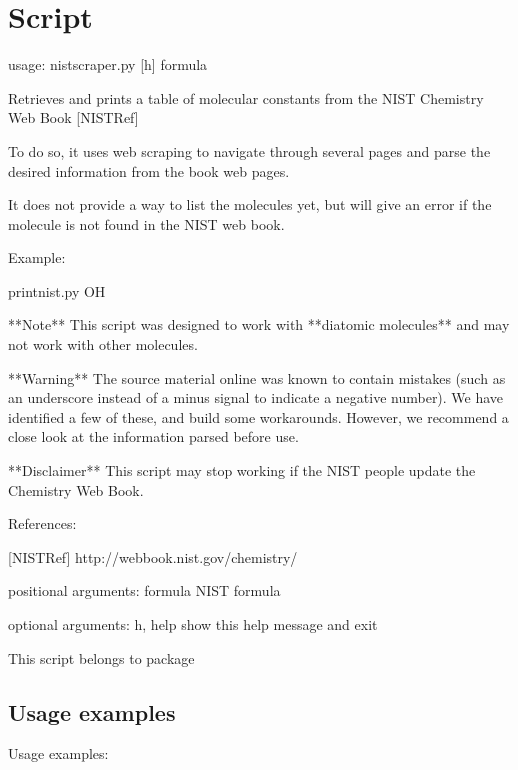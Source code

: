 \documentclass[letterpaper,10pt,english]{sphinxmanual}
\begin{document}
\section{Script }
\label{\detokenize{autoscripts/script-nist-scraper:script-nist-scraper-py}}\label{\detokenize{autoscripts/script-nist-scraper::doc}}
\begin{sphinxVerbatim}[commandchars=\\\{\}]
usage: nist\PYGZhy{}scraper.py [\PYGZhy{}h] formula

Retrieves and prints a table of molecular constants from the NIST Chemistry Web Book [NISTRef]

To do so, it uses web scraping to navigate through several pages and parse the desired information
from the book web pages.

It does not provide a way to list the molecules yet, but will give an error if the molecule is not
found in the NIST web book.

Example:

    print\PYGZhy{}nist.py OH

**Note** This script was designed to work with **diatomic molecules** and may not work with other
         molecules.

**Warning** The source material online was known to contain mistakes (such as an underscore instead
            of a minus signal to indicate a negative number). We have identified a few of these,
            and build some workarounds. However, we recommend a close look at the information parsed
            before use.

**Disclaimer** This script may stop working if the NIST people update the Chemistry Web Book.

References:

[NISTRef] http://webbook.nist.gov/chemistry/

positional arguments:
  formula     NIST formula

optional arguments:
  \PYGZhy{}h, \PYGZhy{}\PYGZhy{}help  show this help message and exit
\end{sphinxVerbatim}

This script belongs to package 


\subsection{Usage examples}
\label{\detokenize{autoscripts/script-nist-scraper:usage-examples}}
Usage examples:
\end{document}
